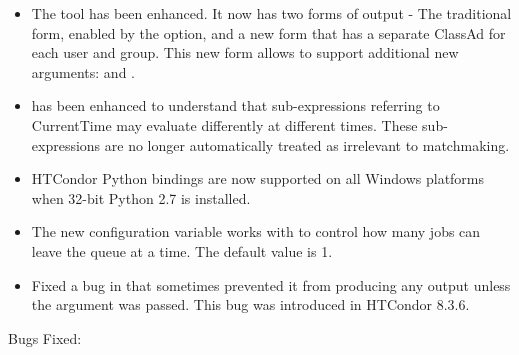 \begin{itemize}
\item The  tool has been enhanced.  It now has two forms of  output -
The traditional form, enabled by the  option, and a new form that has a separate
ClassAd for each user and group.  This new form allows  to support
additional new arguments:  and .

\item {}  has been enhanced to understand that sub-expressions referring
to CurrentTime may evaluate differently at different times. These sub-expressions are no longer
automatically treated as irrelevant to matchmaking.

\item HTCondor Python bindings are now supported on all Windows platforms when 32-bit Python 2.7 is installed.

\item The new configuration variable 
works with  to control how many jobs
can leave the queue at a time. The default value is 1.

\item Fixed a bug in  that sometimes prevented it from producing any output unless the
 argument was passed.  This bug was introduced in HTCondor 8.3.6.

\end{itemize}

\noindent Bugs Fixed:

